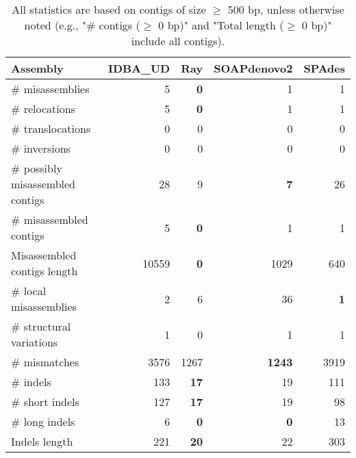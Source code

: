 \documentclass[12pt,a4paper]{article}
\begin{document}
\begin{table}[ht]
\begin{center}
\caption{All statistics are based on contigs of size $\geq$ 500 bp, unless otherwise noted (e.g., "\# contigs ($\geq$ 0 bp)" and "Total length ($\geq$ 0 bp)" include all contigs).}
\begin{tabular}{|l*{4}{|r}|}
\hline
Assembly & IDBA\_UD & Ray & SOAPdenovo2 & SPAdes \\ \hline
\# misassemblies & 5 & {\bf 0} & 1 & 1 \\ \hline
\hspace{5mm}\# relocations & 5 & {\bf 0} & 1 & 1 \\ \hline
\hspace{5mm}\# translocations & 0 & 0 & 0 & 0 \\ \hline
\hspace{5mm}\# inversions & 0 & 0 & 0 & 0 \\ \hline
\# possibly misassembled contigs & 28 & 9 & {\bf 7} & 26 \\ \hline
\# misassembled contigs & 5 & {\bf 0} & 1 & 1 \\ \hline
Misassembled contigs length & 10559 & {\bf 0} & 1029 & 640 \\ \hline
\# local misassemblies & 2 & 6 & 36 & {\bf 1} \\ \hline
\# structural variations & 1 & 0 & 1 & 1 \\ \hline
\# mismatches & 3576 & 1267 & {\bf 1243} & 3919 \\ \hline
\# indels & 133 & {\bf 17} & 19 & 111 \\ \hline
\hspace{5mm}\# short indels & 127 & {\bf 17} & 19 & 98 \\ \hline
\hspace{5mm}\# long indels & 6 & {\bf 0} & {\bf 0} & 13 \\ \hline
Indels length & 221 & {\bf 20} & 22 & 303 \\ \hline
\end{tabular}
\end{center}
\end{table}
\end{document}

